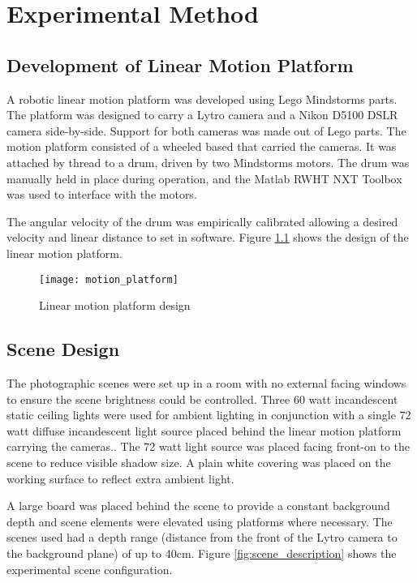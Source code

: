 
\chapter{Experimental Method}
\label{chap:experimental_method}


\section{Development of Linear Motion Platform}
\label{sec:development_of_linear_motion_platform}

A robotic linear motion platform was developed using Lego\textsuperscript{\textregistered} Mindstorms\textsuperscript{\textregistered} parts.
The platform was designed to carry a Lytro camera and a Nikon D5100 DSLR camera side-by-side.
Support for both cameras was made out of Lego parts.
The motion platform consisted of a wheeled based that carried the cameras.
It was attached by thread to a drum, driven by two Mindstorms motors.
The drum was manually held in place during operation, and the Matlab RWHT NXT Toolbox \cite{rwth2007toolbox} was used to interface with the motors.

The angular velocity of the drum was empirically calibrated allowing a desired velocity and linear distance to set in software.
Figure \ref{fig:motion_platform} shows the design of the linear motion platform.

\begin{figure}[h]
\centering
\texttt{[image: motion\_platform]}
\caption[Linear motion platform design]{Linear motion platform design}
\label{fig:motion_platform}
\end{figure}


\section{Scene Design}
\label{sec:scene_design}

The photographic scenes were set up in a room with no external facing windows to ensure the scene brightness could be controlled.
Three 60 watt incandescent static ceiling lights were used for ambient lighting in conjunction with a single 72 watt diffuse incandescent light source placed behind the linear motion platform carrying the cameras..
The 72 watt light source was placed facing front-on to the scene to reduce visible shadow size.
A plain white covering was placed on the working surface to reflect extra ambient light.

A large board was placed behind the scene to provide a constant background depth and scene elements were elevated using platforms where necessary.
The scenes used had a depth range (distance from the front of the Lytro camera to the background plane) of up to 40cm.
Figure \ref{fig:scene_description} shows the experimental scene configuration.

